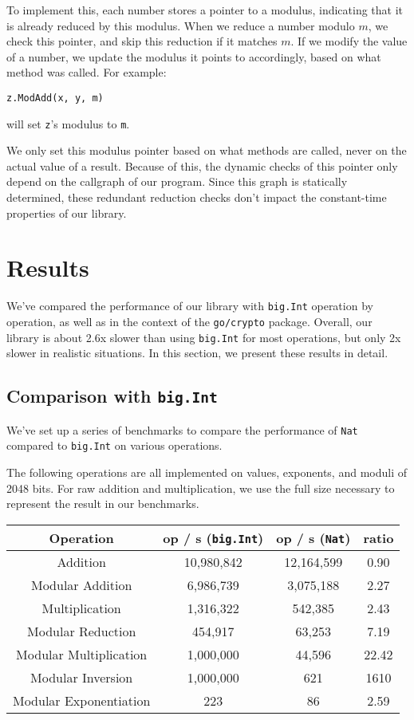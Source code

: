 \documentclass[11pt, a4paper]{article} %
\begin{document}
{To implement this, each number stores a pointer to a modulus,
indicating that it is already reduced by this modulus.
When we reduce a number modulo $m$, we check this pointer,
and skip this reduction if it matches $m$. If we modify
the value of a number, we update the modulus it points to
accordingly, based on what method was called.
For example:
\begin{verbatim}
z.ModAdd(x, y, m)
\end{verbatim}
will set \texttt{z}'s modulus to \texttt{m}.

We only set this modulus pointer based on what methods are called,
never on the actual value of a result. Because of this, the dynamic
checks of this pointer only depend on the callgraph of our program.
Since this graph is statically determined, these redundant reduction
checks don't impact the constant-time properties of our library.

\section{Results}

We've compared the performance of our library
with \texttt{big.Int} operation by operation, as well as in the
context of the \texttt{go/crypto} package.
Overall, our library is about 2.6x slower than using
\texttt{big.Int} for most operations,
but only 2x slower in realistic situations.
In this section, we
present these results in detail.

\subsection{Comparison with \texttt{big.Int}}

We've set up a series of benchmarks to compare the performance
of \texttt{Nat} compared to \texttt{big.Int} on various operations.

The following operations are all implemented on values, exponents,
and moduli of 2048 bits. For raw addition and multiplication,
we use the full size necessary to represent the result in our benchmarks.

\begin{center}
 \begin{tabular}{|c | c | c | c|} 
 \hline
 Operation & op / s (\texttt{big.Int}) & op / s (\texttt{Nat}) & ratio \\ [0.5ex] 
 \hline\hline
 Addition & 10,980,842 & 12,164,599 & 0.90 \\
 \hline
 Modular Addition & 6,986,739 & 3,075,188 & 2.27 \\
 \hline
 Multiplication & 1,316,322 & 542,385 & 2.43 \\
 \hline
 Modular Reduction & 454,917 & 63,253 & 7.19 \\
 \hline
 Modular Multiplication & 1,000,000 & 44,596 & 22.42 \\
 \hline
 Modular Inversion & 1,000,000 & 621 & 1610 \\
 \hline
 Modular Exponentiation & 223 & 86 & 2.59 \\
 \hline
\end{tabular}
\end{center}

}
\end{document}
